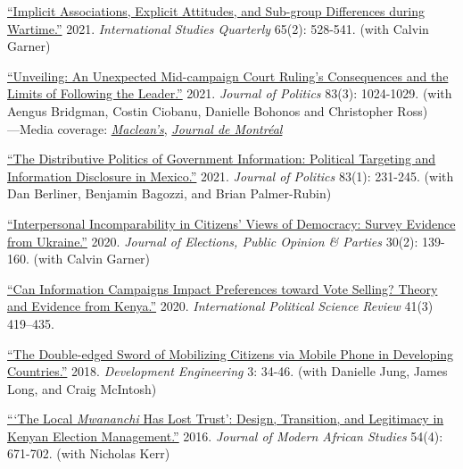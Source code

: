 \documentclass[margin,line]{res}
\begin{document}
\begin{etaremune}
{ \item \href{https://doi.org/10.1093/isq/sqab005}{``Implicit Associations, Explicit Attitudes, and Sub-group Differences during Wartime.''} 2021. \textit{International Studies Quarterly}  65(2): 528-541. (with Calvin Garner)

  \item { \href{https://www.journals.uchicago.edu/doi/full/10.1086/711177}{``Unveiling: An Unexpected Mid-campaign Court Ruling's Consequences and the Limits of Following the Leader.''} 2021. \textit{Journal of Politics} 83(3): 1024-1029. (with Aengus Bridgman, Costin Ciobanu, Danielle Bohonos and Christopher Ross)\\
      ---Media coverage: \href{https://www.macleans.ca/opinion/jagmeet-singh-calls-mp-racist-but-has-he-forgotten-about-bill-21/}{\textit{Maclean's}}, \href{https://www.journaldemontreal.com/2021/06/25/prudence-avec-les-meteorites-pre-electoraux}{\textit{Journal de Montréal}} }

  \item \href{https://doi.org/10.1086/709148}{``The Distributive Politics of Government Information: Political Targeting and Information Disclosure in Mexico.''} 2021. \emph{Journal of Politics} 83(1): 231-245. (with Dan Berliner, Benjamin Bagozzi, and Brian Palmer-Rubin)

  \item \href{https://doi.org/10.1080/17457289.2018.1554664}{ ``Interpersonal Incomparability in Citizens' Views of Democracy: Survey Evidence from Ukraine.''} 2020.  \emph{Journal of Elections, Public Opinion \& Parties}  30(2): 139-160. (with Calvin Garner)

 \item  \href{https://doi.org/10.1177/0192512119836283}{``Can Information Campaigns Impact Preferences toward Vote Selling? Theory and Evidence from Kenya.''} 2020. \emph{International Political Science Review} 41(3) 419–435.

 \item  \href{https://doi.org/10.1016/j.deveng.2017.11.001}{``The Double-edged Sword of Mobilizing Citizens via Mobile Phone in Developing Countries.''} 2018. \emph{Development Engineering}  3: 34-46. (with Danielle Jung, James Long, and Craig McIntosh)

  \item \href{https://doi.org/10.1017/S0022278X16000604}{```The Local \emph{Mwananchi} Has Lost Trust': Design, Transition, and Legitimacy in Kenyan Election Management.''} 2016. \emph{Journal of Modern African Studies} 54(4): 671-702. (with Nicholas Kerr)

}
\end{etaremune}
\end{document}
